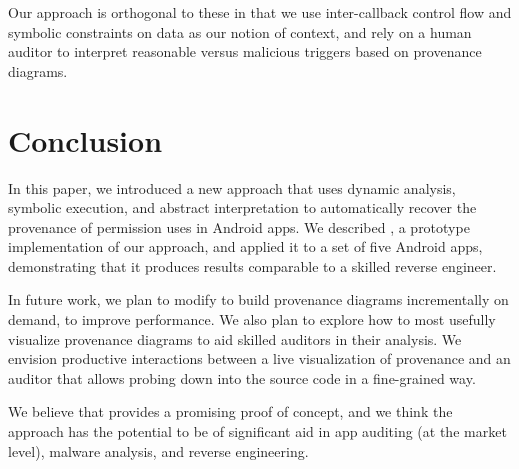 Our approach is orthogonal to these in that we use inter-callback control
flow and symbolic constraints on data as our notion of context, and rely on
a human auditor to interpret reasonable versus malicious triggers based on
provenance diagrams.

\section{Conclusion}
\label{sec:conclusion}

In this paper, we introduced a new approach that uses dynamic
analysis, symbolic execution, and abstract interpretation to
automatically recover the provenance of permission uses in Android
apps. We described \hogarth{}, a prototype implementation of our
approach, and applied it to a set of five Android apps, demonstrating
that it produces results comparable to a skilled reverse engineer.

In future work, we plan to modify \hogarth{} to build provenance
diagrams incrementally on demand, to improve performance.  We also
plan to explore how to most usefully visualize provenance diagrams to
aid skilled auditors in their analysis.  We envision productive
interactions between a live visualization of provenance and an auditor
that allows probing down into the source code in a fine-grained way.

We believe that \hogarth{} provides a promising proof of concept, and
we think the approach has the potential to be of significant aid in
app auditing (at the market level), malware analysis, and reverse
engineering.

%
